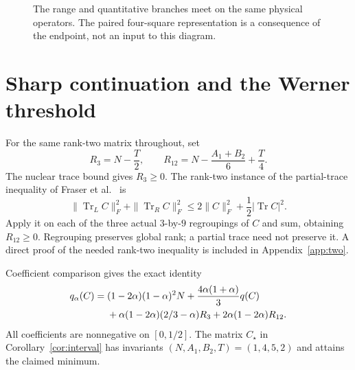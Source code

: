 \documentclass[11pt,a4paper]{article}
\theoremstyle{definition}\newtheorem{definition}[theorem]{Definition}
\theoremstyle{remark}\newtheorem{remark}[theorem]{Remark}
\DeclareMathOperator{\Tr}{Tr}\DeclareMathOperator{\rank}{rank}
\numberwithin{equation}{section}
\begin{document}
\begin{figure}[ht]
\centering
{}
\caption{The range and quantitative branches meet on the same
physical operators. The paired four-square representation is a
consequence of the endpoint, not an input to this diagram.}
\end{figure}

\section{Sharp continuation and the Werner threshold}\label{sec:interval}
For the same rank-two matrix throughout, set
\begin{equation}
R_3=N-\frac T2,\qquad
R_{12}=N-\frac{A_1+B_2}{6}+\frac T4.
\label{eq:reserves}
\end{equation}
The nuclear trace bound gives $R_3\ge0$.
The rank-two instance of the partial-trace inequality of
Fraser et al.~\cite{fraser} is
\begin{equation}
\|\Tr_LC\|_F^2+\|\Tr_RC\|_F^2
\le2\|C\|_F^2+\frac12|\Tr C|^2.
\label{eq:two}
\end{equation}
Apply it on each of the three actual $3$-by-$9$ regroupings of $C$
and sum, obtaining $R_{12}\ge0$. Regrouping preserves global rank;
a partial trace need not preserve it. A direct proof of the needed
rank-two inequality is included in Appendix~\ref{app:two}.

Coefficient comparison gives the exact identity
\begin{align}
q_\alpha(C)={}&(1-2\alpha)(1-\alpha)^2N
+\frac{4\alpha(1+\alpha)}3q(C)\notag\\
&+\alpha(1-2\alpha)(2/3-\alpha)R_3
+2\alpha(1-2\alpha)R_{12}.
\label{eq:continuation}
\end{align}
All coefficients are nonnegative on $[0,1/2]$.
The matrix $C_\star$ in Corollary~\ref{cor:interval} has invariants
$(N,A_1,B_2,T)=(1,4,5,2)$ and attains the claimed minimum.
\end{document}
